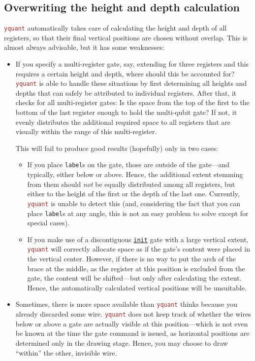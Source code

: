 \documentclass{scrartcl}
\def\pkg#1{\textcolor{brown}{\texttt{#1}}}
\def\gate#1{\hyperref[gate:#1]{\texttt{#1}}}
\def\Yquant{\pkg{yquant}}
\begin{document}
      \subsection{Overwriting the height and depth calculation}
         \Yquant{} automatically takes care of calculating the height and depth of all registers, so that their final vertical positions are chosen without overlap.
         This is almost always advisable, but it has some weaknesses:
         \begin{itemize}
            \item If you specify a multi\hyp register gate, say, extending for three registers and this requires a certain height and depth, where should this be accounted for?
               \Yquant{} is able to handle these situations by first determining all heights and depths that can safely be attributed to individual registers.
               After that, it checks for all multi\hyp register gates: Is the space from the top of the first to the bottom of the last register enough to hold the multi\hyp qubit gate?
               If not, it evenly distributes the additional required space to all registers that are visually within the range of this multi\hyp register.

               This will fail to produce good results (hopefully) only in two cases:
               \begin{itemize}
                  \item If you place \texttt{label}s on the gate, those are outside of the gate---and typically, either below or above.
                     Hence, the additional extent stemming from them should \emph{not} be equally distributed among all registers, but either to the height of the first or the depth of the last one.
                     Currently, \Yquant{} is unable to detect this (and, considering the fact that you can place \texttt{label}s at any angle, this is not an easy problem to solve except for special cases).
                  \item If you make use of a discontiguous \gate{init} gate with a large vertical extent, \Yquant{} will correctly allocate space as if the gate's content were placed in the vertical center.
                     However, if there is no way to put the arch of the brace at the middle, as the register at this position is excluded from the gate, the content will be shifted---but only after calculating the extent.
                     Hence, the automatically calculated vertical positions will be unsuitable.
               \end{itemize}
            \item Sometimes, there is more space available than \Yquant{} thinks because you already discarded some wire.
               \Yquant{} does not keep track of whether the wires below or above a gate are actually visible at this position---which is not even be known at the time the gate command is issued, as horizontal positions are determined only in the drawing stage.
               Hence, you may choose to draw ``within'' the other, invisible wire.
         \end{itemize}
\end{document}
